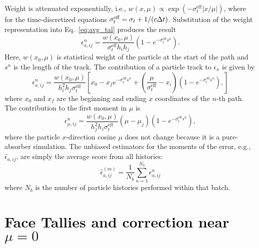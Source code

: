 Weight is attenuated exponentially, i.e., $w(x,\mu)\propto
\exp(-\sigma_{t}^{\text{eff}}|x/\mu|)$, where for the time-discretized equations
$\sigma_{t}^{\text{eff}}=\sigma_t + 1/(c\Delta t)$. Substitution of the weight representation into
Eq.~\eqref{eq:avg_tal} produces the result
\begin{equation}
    \epsilon^n_{a,ij} = \frac{w(x_0,\mu)}{\sigma_{t}^{\text{eff}} h_i h_j} \left(1 -
    e^{-\sigma_{t}^{\text{eff}}s^n}\right).
\end{equation}
Here, $w(x_0,\mu)$ is statistical weight of the particle at the start of the path and $s^n$ is the
length of the track. The contribution of a
particle track to $\epsilon_x$ is given by
\begin{equation}
    \epsilon^n_{x,ij} = \frac{w(x_0,\mu)}{h_i^2h_j \sigma_{t}^{\text{eff}}} \left[x_0 - x_f e^{-\sigma_{t}^{\text{eff}} s^n}
        + \left(\frac{\mu}{\sigma_{t}^{\text{eff}}} - x_i \right)\left(1-e^{-\sigma_{t}^{\text{eff}} s^n}\right),
    \right]
\end{equation}
where $x_0$ and $x_f$ are the beginning and ending $x$ coordinates of the $n$-th
path.  The contribution to the first moment in $\mu$ is 
\begin{equation}
    \epsilon^n_{\mu,ij} = \frac{w(x_0,\mu)}{h_{j}^2h_i\sigma_{t}^{\text{eff}}}\left(\mu -
    \mu_j\right) \left(1 - e^{-\sigma_{t}^{\text{eff}}s^n}\right),
\end{equation}
where the particle $x$-direction cosine $\mu$ does not change because it is a pure-absorber simulation.
The unbiased estimators for the moments of the error, e.g., $\hat \epsilon_{a,ij}$, are simply the
average score from all histories:
\begin{equation}
    \hat\epsilon_{a,ij}^{(m)}  = \frac{1}{N_b} \sum\limits_{n=1}^{N_b} \epsilon^n_{a,ij}
\end{equation}
where $N_b$ is the number of particle histories performed within that batch.




\section{Face Tallies and correction near $\mu=0$}
\label{sec:face_tallies}

